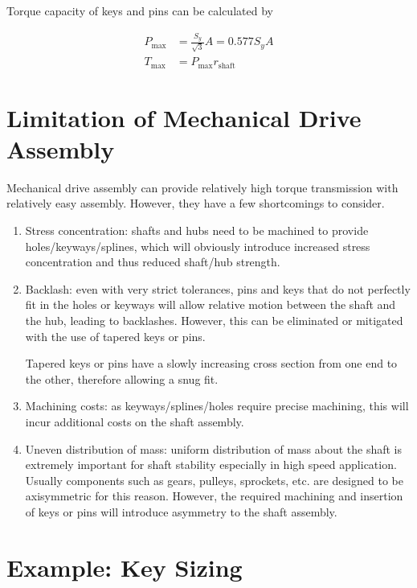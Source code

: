 \documentclass[a4paper,openany]{tufte-book}
\begin{document}
Torque capacity of keys and pins can be calculated by

\begin{align*}
  P_{\max} &= \frac{S_{y}}{\sqrt{3}}A = 0.577 S_{y}A \\
  T_{\max} &= P_{\max}r_{\text{shaft}}
\end{align*}

\section{Limitation of Mechanical Drive Assembly}
\label{sec:org38fc38a}

Mechanical drive assembly can provide relatively high torque transmission with relatively easy assembly. However, they have a few shortcomings to consider.

\begin{enumerate}
\item Stress concentration: shafts and hubs need to be machined to provide holes/keyways/splines, which will obviously introduce increased stress concentration and thus reduced shaft/hub strength.

\item Backlash: even with very strict tolerances, pins and keys that do not perfectly fit in the holes or keyways will allow relative motion between the shaft and the hub, leading to backlashes. However, this can be eliminated or mitigated with the use of tapered keys or pins.

Tapered keys or pins have a slowly increasing cross section from one end to the other, therefore allowing a snug fit.

\item Machining costs: as keyways/splines/holes require precise machining, this will incur additional costs on the shaft assembly.

\item Uneven distribution of mass: uniform distribution of mass about the shaft is extremely important for shaft stability especially in high speed application. Usually components such as gears, pulleys, sprockets, etc. are designed to be axisymmetric for this reason. However, the required machining and insertion of keys or pins will introduce asymmetry to the shaft assembly.
\end{enumerate}

\section{Example: Key Sizing}
\label{sec:orge437465}
\end{document}
